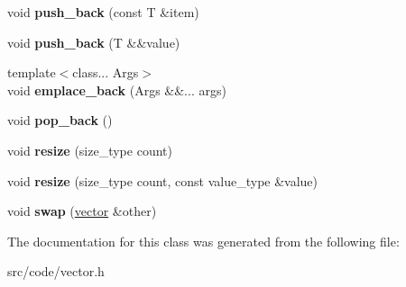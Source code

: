 \begin{DoxyCompactItemize}
void {\bfseries push\+\_\+back} (const T \&item)
\item 
\mbox{\label{classvector_a38d807015ecd56526ca3ae6811ab2b4d}} 
void {\bfseries push\+\_\+back} (T \&\&value)
\item 
\mbox{\label{classvector_af48ef7dda99019486fbfd87cb85ee209}} 
{\footnotesize template$<$class... Args$>$ }\\void {\bfseries emplace\+\_\+back} (Args \&\&... args)
\item 
\mbox{\label{classvector_ae7bd06c29fa3577b162de40b20bc9232}} 
void {\bfseries pop\+\_\+back} ()
\item 
\mbox{\label{classvector_aa67dd01fe91c5189336bed8b4ce4965b}} 
void {\bfseries resize} (size\+\_\+type count)
\item 
\mbox{\label{classvector_ae03922e44d3c1bcc8ea6f3cde8ab7592}} 
void {\bfseries resize} (size\+\_\+type count, const value\+\_\+type \&value)
\item 
\mbox{\label{classvector_a2705289c4e3ee87c6b69f4a3c295017f}} 
void {\bfseries swap} (\mbox{\hyperlink{classvector}{vector}} \&other)
\end{DoxyCompactItemize}


The documentation for this class was generated from the following file\+:\begin{DoxyCompactItemize}
\item 
src/code/vector.\+h\end{DoxyCompactItemize}
